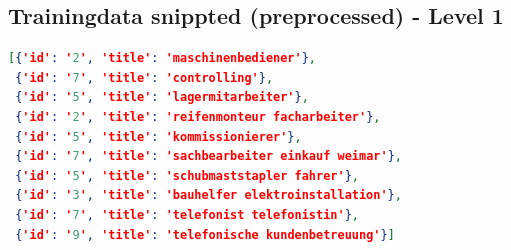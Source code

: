 \documentclass[12pt, a4paper, titlepage]{article}
\begin{document}
\subsection{Trainingdata snippted (preprocessed) - Level 1}
\begin{lstlisting}[language=json, firstnumber=1]
[{'id': '2', 'title': 'maschinenbediener'},
 {'id': '7', 'title': 'controlling'},
 {'id': '5', 'title': 'lagermitarbeiter'},
 {'id': '2', 'title': 'reifenmonteur facharbeiter'},
 {'id': '5', 'title': 'kommissionierer'},
 {'id': '7', 'title': 'sachbearbeiter einkauf weimar'},
 {'id': '5', 'title': 'schubmaststapler fahrer'},
 {'id': '3', 'title': 'bauhelfer elektroinstallation'},
 {'id': '7', 'title': 'telefonist telefonistin'},
 {'id': '9', 'title': 'telefonische kundenbetreuung'}]
\end{lstlisting}
\end{document}
